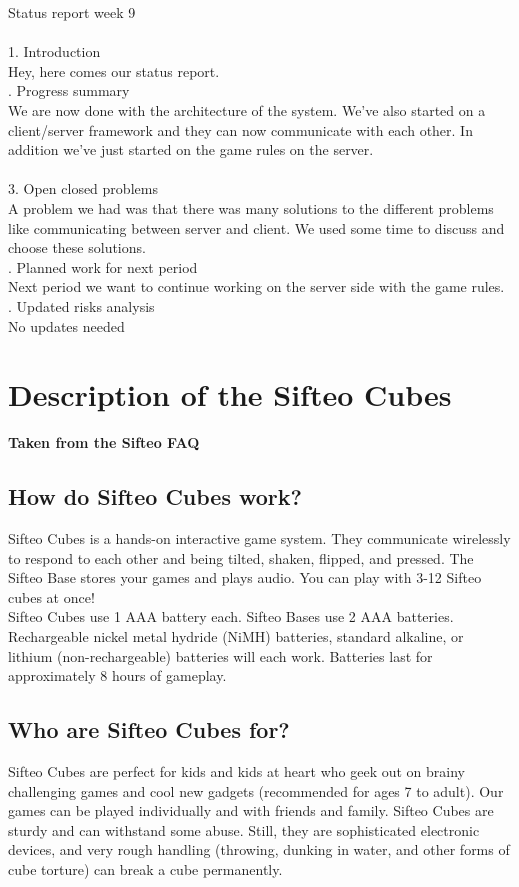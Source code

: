 \noindent Status report week 9\\
\\
1. Introduction\\
Hey, here comes our status report.\\

. Progress summary\\
We are now done with the architecture of the system. We've also started on a client/server framework and they can now communicate with each other. In addition we've just started on the game rules on the server. \\
\\
3. Open closed problems\\ 
A problem we had was that there was many solutions to the different problems like communicating between server and client. We used some time to discuss and choose these solutions. \\

. Planned work for next period\\ 
Next period we want to continue working on the server side with the game rules.\\

. Updated risks analysis\\
No updates needed


\chapter{Description of the Sifteo Cubes}
\label{appendix:G}

\textbf{Taken from the Sifteo FAQ}


\section{How do Sifteo Cubes work?}
Sifteo Cubes is a hands-on interactive game system. They communicate wirelessly to respond to each other and being tilted, shaken, flipped, and pressed. The Sifteo Base stores your games and plays audio. You can play with 3-12 Sifteo cubes at once!\\
Sifteo Cubes use 1 AAA battery each. Sifteo Bases use 2 AAA batteries. Rechargeable nickel metal hydride (NiMH) batteries, standard alkaline, or lithium (non-rechargeable) batteries will each work. Batteries last for approximately 8 hours of gameplay.

\section{Who are Sifteo Cubes for?}
Sifteo Cubes are perfect for kids and kids at heart who geek out on brainy challenging games and cool new gadgets (recommended for ages 7 to adult). Our games can be played individually and with friends and family. Sifteo Cubes are sturdy and can withstand some abuse. Still, they are sophisticated electronic devices, and very rough handling (throwing, dunking in water, and other forms of cube torture) can break a cube permanently.

